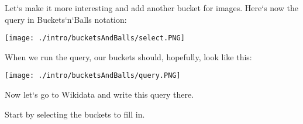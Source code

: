\newpage
Let`s make it more interesting and add another bucket for images. Here`s now the query in Buckets`n`Balls notation:

\begin{figure*}[h!]
\texttt{[image: ./intro/bucketsAndBalls/select.PNG]}
\end{figure*}

When we run the query, our buckets should, hopefully, look like this:

\begin{figure*}[h!]
\texttt{[image: ./intro/bucketsAndBalls/query.PNG]}
\end{figure*}

Now let`s go to Wikidata and write this query there.

Start by selecting the buckets to fill in.